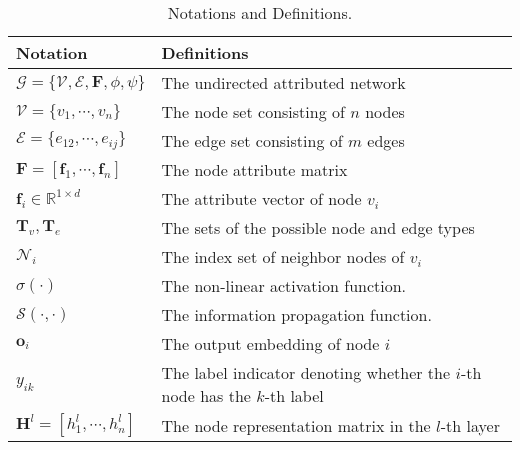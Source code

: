 \begin{table}[!h]
	\centering
	\small
	\caption{Notations and Definitions.}
    	\begin{tabular}{l|p{5.5cm}}              
    		\toprule
    		\midrule
    		Notation    & Definitions  \\ 
    		\midrule
    		$\mathcal{G}=\{\mathcal{V},\mathcal{E},\mathbf{F}, \phi, \psi\}$    & The undirected attributed network   \\
                \midrule
                $\mathcal{V}=\{v_1, \cdots, v_n\}$    & The node set consisting of $n$ nodes  \\ 
                \midrule
                $\mathcal{E}=\{e_{12}, \cdots, e_{ij}\}$    & The edge set consisting of $m$ edges\\
                \midrule
                $\mathbf{F}=[ \mathbf{f}_{1}, \cdots, \mathbf{f}_{n} ]$  & The node attribute matrix \\
                \midrule
                $\mathbf{f}_{i} \in \mathbb{R}^{1 \times d}$ & The attribute vector of node $v_{i}$ \\
                \midrule
                $\mathbf{T}_{v}, \mathbf{T}_{e}$ & The sets of the possible node and edge types \\
                \midrule
                $\mathcal{N}_{i}$& The index set of neighbor nodes of $v_{i}$ \\
                \midrule
                $\sigma(\cdot)$ & The non-linear activation function. \\
                \midrule
                $\mathcal{S}(\cdot, \cdot)$ & The information propagation function.\\
                \midrule
                $\boldsymbol{o}_i$ & The output embedding of node $i$ \\
                \midrule
                $y_{ik}$ & The label indicator denoting whether the $i$-th node has the $k$-th label \\
                \midrule
                $\mathbf{H}^{l} = [h_{1}^{l}, \cdots, h_{n}^{l}]$ & The node representation matrix in the $l$-th layer\\

\end{tabular}
\end{table}
